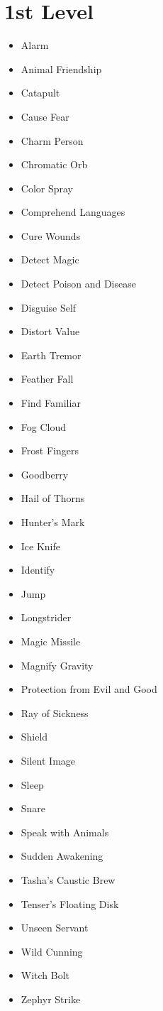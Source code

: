 \documentclass[a4paper,10pt,twoside,twocolumn, bg=print]{dndbook} %
\begin{document}
		\section{1st Level}
			\begin{itemize}
				\item Alarm
				\item Animal Friendship
				\item Catapult
				\item Cause Fear
				\item Charm Person
				\item Chromatic Orb
				\item Color Spray
				\item Comprehend Languages
				\item Cure Wounds
				\item Detect Magic
				\item Detect Poison and Disease 	
				\item Disguise Self
				\item Distort Value
				\item Earth Tremor
				\item Feather Fall
				\item Find Familiar
				\item Fog Cloud
				\item Frost Fingers
				\item Goodberry
				\item Hail of Thorns
				\item Hunter's Mark
				\item Ice Knife
				\item Identify
				\item Jump
				\item Longstrider
				\item Magic Missile
				\item Magnify Gravity
				\item Protection from Evil and Good
				\item Ray of Sickness
				\item Shield
				\item Silent Image
				\item Sleep
				\item Snare
				\item Speak with Animals
				\item Sudden Awakening
				\item Tasha's Caustic Brew
				\item Tenser's Floating Disk
				\item Unseen Servant
				\item Wild Cunning
				\item Witch Bolt
				\item Zephyr Strike
			\end{itemize}
		\vfill\pagebreak
\end{document}
